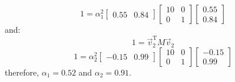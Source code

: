 \documentclass[12pt,letter]{article}
\begin{document}
\begin{example}
	\begin{equation}
	1 = \alpha_1^2 \begin{bmatrix} 0.55 &  0.84 \end{bmatrix} \begin{bmatrix} 10 & 0 \\    0  & 1 \end{bmatrix}  \begin{bmatrix} 0.55 \\  0.84 \end{bmatrix}
	\end{equation}
	and:
	\begin{equation}
	1 = \vec{v}_2^\text{T} M \vec{v}_2 
	\end{equation}
	\begin{equation}
	1 = \alpha_2^2 \begin{bmatrix} -0.15 &  0.99 \end{bmatrix} \begin{bmatrix} 10 & 0 \\    0  & 1 \end{bmatrix}  \begin{bmatrix} -0.15 \\  0.99 \end{bmatrix}
	\end{equation}
	therefore, $\alpha_1=0.52$ and $\alpha_2=0.91$.


\end{example}
\end{document}
